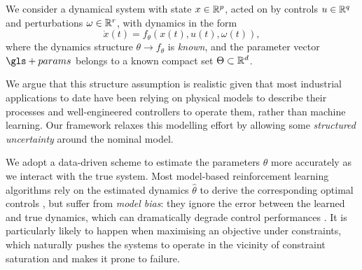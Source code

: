 \begin{assumption}
\begin{leftbar}[assumptionbar]
We consider a dynamical system with state $x\in\mathbb{R}^p$, acted on by controls $u\in\mathbb{R}^q$ and perturbations $\omega\in\mathbb{R}^r$, with dynamics in the form
\begin{equation*}
\dot{x}(t) = f_\theta\left(x(t),u(t),\omega(t)\right),
\end{equation*}
where the dynamics structure $\theta\rightarrow f_\theta$ is \emph{known}, and the parameter vector $\gls+{params}$ belongs to a known compact set $\Theta \subset \mathbb{R}^d$.
\end{leftbar}
\end{assumption}
\noindent We argue that this structure assumption is realistic given that most industrial applications to date have been relying on physical models to describe their processes and well-engineered controllers to operate them, rather than machine learning. Our framework relaxes this modelling effort by allowing some \emph{structured uncertainty} around the nominal model.

We adopt a data-driven scheme to estimate the parameters $\theta$ more accurately as we interact with the true system. Most model-based reinforcement learning algorithms rely on the estimated dynamics $\hat{\theta}$ to derive the corresponding optimal controls \citep[\eg][]{Lenz2015,Levine2016}, but suffer from \emph{model bias}: they ignore the error between the learned and true dynamics, which can dramatically degrade control performances \citep{Doyle1978,Schneider1997}. It is particularly likely to happen when maximising an objective under constraints, which naturally pushes the systems to operate in the vicinity of constraint saturation and makes it prone to failure.


